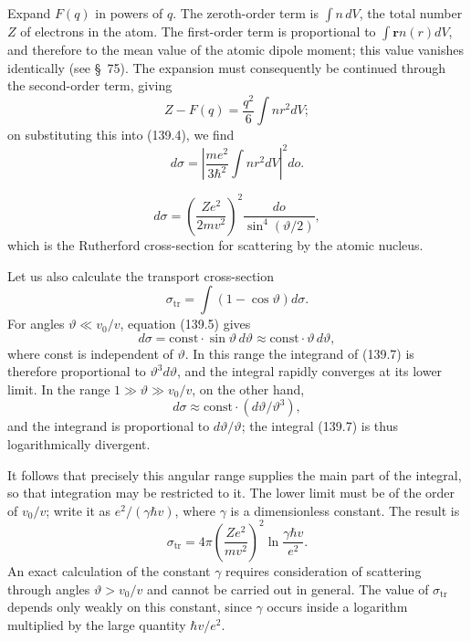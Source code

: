 Expand $F(q)$ in powers of $q$. The zeroth-order term is $\int n\,dV$, the total number $Z$ of electrons in the atom. The first-order term is proportional to $\int\mathbf r n(r)dV$, and therefore to the mean value of the atomic dipole moment; this value vanishes identically (see \S~75). The expansion must consequently be continued through the second-order term, giving
\[
 Z-F(q)=\frac{q^2}{6}\int nr^2dV;
\]
on substituting this into (139.4), we find
\begin{equation}
 d\sigma=\left|\frac{me^2}{3\hbar^2}\int nr^2dV\right|^2d o.
 \tag{139.5}
\end{equation}

\begin{equation}
 d\sigma=\left(\frac{Ze^2}{2mv^2}\right)^2\frac{d o}{\sin^4(\vartheta/2)},
 \tag{139.6}
\end{equation}
which is the Rutherford cross-section for scattering by the atomic nucleus.

Let us also calculate the transport cross-section
\begin{equation}
 \sigma_{\mathrm{tr}}=\int(1-\cos\vartheta)d\sigma.
 \tag{139.7}
\end{equation}
For angles $\vartheta\ll v_0/v$, equation (139.5) gives
\[
 d\sigma=\mathrm{const}\cdot\sin\vartheta\,d\vartheta
 \approx\mathrm{const}\cdot\vartheta\,d\vartheta,
\]
where const is independent of $\vartheta$. In this range the integrand of (139.7) is therefore proportional to $\vartheta^3d\vartheta$, and the integral rapidly converges at its lower limit. In the range $1\gg\vartheta\gg v_0/v$, on the other hand,
\[
 d\sigma\approx\mathrm{const}\cdot(d\vartheta/\vartheta^3),
\]
and the integrand is proportional to $d\vartheta/\vartheta$; the integral (139.7) is thus logarithmically divergent.

It follows that precisely this angular range supplies the main part of the integral, so that integration may be restricted to it. The lower limit must be of the order of $v_0/v$; write it as $e^2/(\gamma\hbar v)$, where $\gamma$ is a dimensionless constant. The result is
\begin{equation}
 \sigma_{\mathrm{tr}}=4\pi\left(\frac{Ze^2}{mv^2}\right)^2
 \ln\frac{\gamma\hbar v}{e^2}.
 \tag{139.8}
\end{equation}
An exact calculation of the constant $\gamma$ requires consideration of scattering through angles $\vartheta>v_0/v$ and cannot be carried out in general. The value of $\sigma_{\mathrm{tr}}$ depends only weakly on this constant, since $\gamma$ occurs inside a logarithm multiplied by the large quantity $\hbar v/e^2$.

